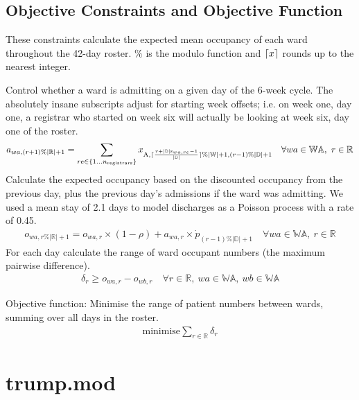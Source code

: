\documentclass[a4paper]{article}
\DeclarePairedDelimiter{\ceil}{\lceil}{\rceil}
\begin{document}
\subsection{Objective Constraints and Objective Function}

These constraints calculate the expected mean occupancy of each ward throughout the 42-day roster. $\%$ is the modulo function and $\ceil{x}$ rounds up to the nearest integer.

Control whether a ward is admitting on a given day of the 6-week cycle. The absolutely insane subscripts adjust for starting week offsets; i.e. on week one, day one, a registrar who started on week six will actually be looking at week six, day one of the roster.
\begin{align}
  a_{wa, (r+1)\%|\mathbb{R}|+1} = \sum_{re\in \{1\dots n_\text{registrars}\}}{x_{\text{A}, \ceil{\frac{r+|\mathbb{D}|\text{s}_{wa, re}-1}{|\mathbb{D}|}} \% |\mathbb{W}|+1, (r-1) \% |\mathbb{D}|+1}} \quad\forall wa \in \mathbb{WA},\ r \in \mathbb{R}
\end{align}
Calculate the expected occupancy based on the discounted occupancy from the previous day, plus the previous day's admissions if the ward was admitting. We used a mean stay of 2.1 days to model discharges as a Poisson process with a rate of 0.45.
\begin{align}
  o_{wa, r\%|\mathbb{R}|+1} = o_{wa, r} \times (1-\rho) + a_{wa, r} \times \dot{p}_{(r-1)\%|\mathbb{D}|+1} \quad\forall wa \in \mathbb{WA},\ r \in \mathbb{R}
\end{align}
For each day calculate the range of ward occupant numbers (the maximum pairwise difference).
\begin{align}
  \delta_r \ge o_{wa, r} - o_{wb, r} \quad\forall r \in \mathbb{R},\ wa \in \mathbb{WA},\ wb \in \mathbb{WA}
\end{align}

\begin{framed}
Objective function: Minimise the range of patient numbers between wards, summing over all days in the roster.
\begin{align}
  \text{minimise} \sum_{r\in \mathbb{R}}{\delta_r}
\end{align}
\end{framed}

\newpage
\appendix
\section{trump.mod}

\end{document}
